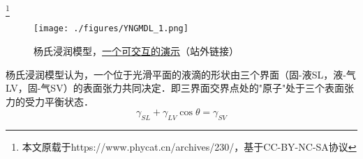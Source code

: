 \footnote{本文原载于https://www.phycat.cn/archives/230/，基于CC-BY-NC-SA协议}

\begin{figure}[ht]
\centering
\texttt{[image: ./figures/YNGMDL\_1.png]}
\caption{杨氏浸润模型，\href{https://www.phycat.cn/archives/230/}{一个可交互的演示}（站外链接）} \label{YNGMDL_fig1}
\end{figure}
杨氏浸润模型认为，一个位于光滑平面的液滴的形状由三个界面（固-液SL，液-气LV，固-气SV）的表面张力共同决定．即三界面交界点处的"原子"处于三个表面张力的受力平衡状态．
\begin{equation}
\gamma_{SL}+\gamma_{LV}\cos\theta=\gamma_{SV}
\end{equation}
